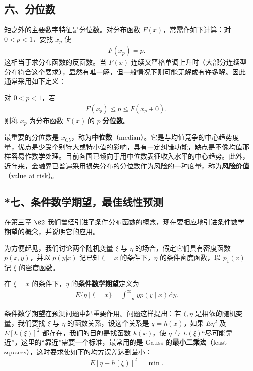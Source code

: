 \documentclass[../../main.tex]{subfiles}
\begin{document}
\subsection*{六、分位数}

矩之外的主要数字特征是分位数。对分布函数 $F(x)$，常需作如下计算：对 $0<p<1$，要找 $x_p$ 使
\begin{align}
F(x_p)=p.\label{align:ch04-分位数方程}
\end{align}
这相当于求分布函数的反函数。当 $F(x)$ 连续又严格单调上升时（大部分连续型分布符合这个要求），显然有唯一解，但一般情况下则可能无解或有许多解。因此通常采用如下定义：

\begin{definition}[分位数]\label{definition:ch04-分位数}
对 $0<p<1$，若
\begin{align}
F(x_p)\leqslant p\leqslant F(x_p+0),\label{align:ch04-分位数定义}
\end{align}
则称 $x_p$ 为分布函数 $F(x)$ 的 $p$ \textbf{分位数}。
\end{definition}

最重要的分位数是 $x_{0.5}$，称为\textbf{中位数}（median）。它是与均值竞争的中心趋势度量，优点是少受个别特大或特小值的影响，具有一定纠错功能，缺点是不像均值那样容易作数学处理。目前各国已倾向于用中位数表征收入水平的中心趋势。此外，近年来，金融界已普遍采用损失分布的分位数作为风险的一种度量，称为\textbf{风险价值}（value at risk）。

\subsection*{*七、条件数学期望，最佳线性预测}

在第三章 $\S 2$ 我们曾经引进了条件分布函数的概念，现在要相应地引进条件数学期望的概念，并说明它的应用。

为方便起见，我们讨论两个随机变量 $\xi$ 与 $\eta$ 的场合，假定它们具有密度函数 $p(x,y)$，并以 $p(y|x)$ 记已知 $\xi=x$ 的条件下，$\eta$ 的条件密度函数，以 $p_1(x)$ 记 $\xi$ 的密度函数。

\begin{definition}[条件数学期望]\label{definition:ch04-条件期望}
在 $\xi=x$ 的条件下，$\eta$ 的\textbf{条件数学期望}定义为
\begin{align}
E\{\eta\mid\xi=x\}=\int_{-\infty}^{\infty} y p(y\mid x)\,\mathrm{d}y.\label{align:ch04-条件期望定义}
\end{align}
\end{definition}

条件数学期望在预测问题中起重要作用。问题这样提出：若 $\xi,\eta$ 是相依的随机变量，我们要找 $\xi$ 与 $\eta$ 的函数关系，设这个关系是 $y=h(x)$，如果 $E\eta^2$ 及 $E[h(\xi)]^2$ 都存在，我们的目的是找函数 $h(x)$，使 $\eta$ 与 $h(\xi)$``尽可能靠近''，这里的``靠近''需要一个标准，最常用的是 Gauss 的\textbf{最小二乘法}（least squares），这时要求使如下的均方误差达到最小：
\begin{align}
E[\eta-h(\xi)]^2=\min.\label{align:ch04-最小二乘}
\end{align}
\end{document}
